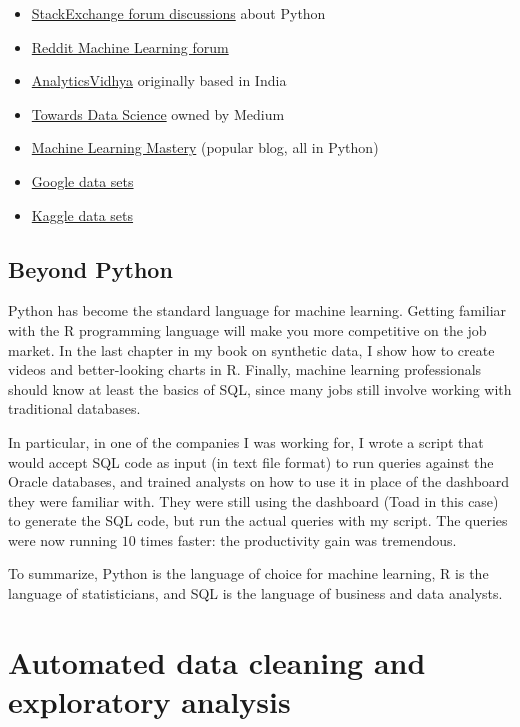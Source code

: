 \documentclass[oneside,10pt]{book}
\begin{document}
\begin{itemize}
\item \href{https://stackoverflow.com/questions/tagged/python}{StackExchange forum discussions} about Python 
\item \href{https://www.reddit.com/r/MachineLearning/}{Reddit Machine Learning forum} 
\item \href{https://www.analyticsvidhya.com/}{AnalyticsVidhya} originally based in India
\item \href{https://towardsdatascience.com/}{Towards Data Science} owned by Medium 
\item \href{https://machinelearningmastery.com/}{Machine Learning Mastery} (popular blog, all in Python)  
\item \href{https://datasetsearch.research.google.com/}{Google data sets}
\item \href{https://www.kaggle.com/datasets/}{Kaggle data sets} 
\end{itemize}


\subsection{Beyond Python}

Python has become the standard language for machine learning. Getting familiar with the R programming language will make you more competitive on the job market. In the last chapter in my book on synthetic data, 
 I show how to create videos and better-looking charts in R. Finally, machine learning professionals should know at least the basics of SQL, since many jobs still involve working with traditional databases. 

In particular, in one of the companies I was working for, I wrote a script that would accept SQL code as input (in text file format) to run queries against the Oracle databases, and trained analysts on how to use it in place of the dashboard they were familiar with. They were still using the dashboard (Toad in this case) to generate the SQL code, but run the actual queries with my script. The queries were now running $10$ times faster: the productivity gain was tremendous.  

To summarize, Python is the language of choice for machine learning, R is the language of statisticians, and SQL is the language of business and data analysts.

\section{Automated data cleaning and exploratory analysis}
\end{document}
